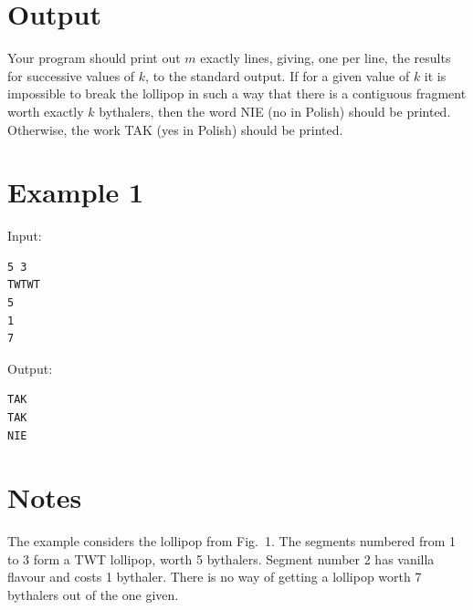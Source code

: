 \documentclass[11pt]{article}
\begin{document}
\section*{Output}

Your program should print out $m$ exactly lines, giving, one per line, the results for successive values of $k$, to the standard output. If for a given value of $k$ it is impossible to break the lollipop in such a way that there is a contiguous fragment worth exactly $k$ bythalers, then the word NIE (no in Polish) should be printed. Otherwise, the work TAK (yes in Polish) should be printed. 

\section*{Example 1}
Input:

\begin{verbatim}
5 3
TWTWT
5
1
7
\end{verbatim}

\noindent Output:

\begin{verbatim}
TAK
TAK
NIE
\end{verbatim}
\section*{Notes}
The example considers the lollipop from Fig.~1. The segments numbered from 1 to 3 form a TWT lollipop, worth 5 bythalers. Segment number 2 has vanilla flavour and costs 1 bythaler. There is no way of getting a lollipop worth 7 bythalers out of the one given. 
\end{document}
